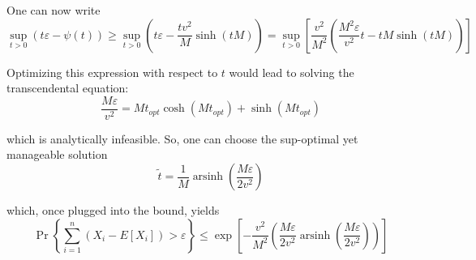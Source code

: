 \documentclass{article}
\DeclareMathOperator{\arsinh}{arsinh}
\begin{document}
One can now write
\[
\sup_{t>0}\left( t\varepsilon -\psi (t)\right) \geq \sup_{t>0}\left(
t\varepsilon -\frac{tv^{2}}{M}\sinh \left( tM\right) \right) =\sup_{t>0}%
\left[ \frac{v^{2}}{M^{2}}\left( \frac{M^{2}\varepsilon }{v^{2}}t-tM\sinh
\left( tM\right) \right) \right] 
\]

Optimizing this expression with respect to $t$ would lead to solving the
transcendental equation:
\[
\frac{M\varepsilon }{v^{2}}=Mt_{opt}\cosh \left( Mt_{opt}\right) +\sinh
\left( Mt_{opt}\right) 
\]

which is analytically infeasible. So, one can choose the sup-optimal yet
manageable solution
\[
\widetilde{t}=\frac{1}{M}\arsinh\left( \frac{M\varepsilon }{2v^{2}}\right) 
\]

which, once plugged into the bound, yields
\[
\Pr\left\{ \sum_{i=1}^{n}\left( X_{i}-E[X_{i}]\right) >\varepsilon \right\}
\leq \exp \left[ -\frac{v^{2}}{M^{2}}\left( \frac{M\varepsilon }{2v^{2}}%
\arsinh\left( \frac{M\varepsilon }{2v^{2}}\right) \right) \right] 
\]
\end{document}
